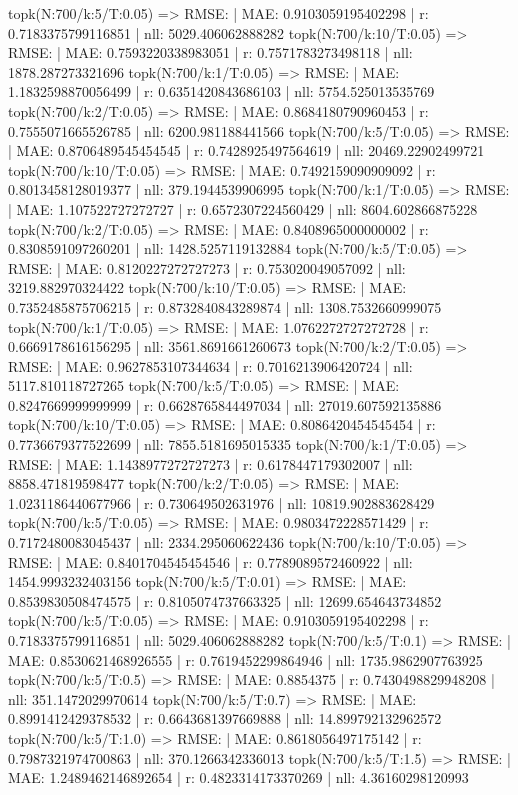 topk(N:700/k:5/T:0.05) => RMSE: | MAE: 0.9103059195402298 | r: 0.7183375799116851 | nll: 5029.406062888282
topk(N:700/k:10/T:0.05) => RMSE: | MAE: 0.7593220338983051 | r: 0.7571783273498118 | nll: 1878.287273321696
topk(N:700/k:1/T:0.05) => RMSE: | MAE: 1.1832598870056499 | r: 0.6351420843686103 | nll: 5754.525013535769
topk(N:700/k:2/T:0.05) => RMSE: | MAE: 0.8684180790960453 | r: 0.7555071665526785 | nll: 6200.981188441566
topk(N:700/k:5/T:0.05) => RMSE: | MAE: 0.8706489545454545 | r: 0.7428925497564619 | nll: 20469.22902499721
topk(N:700/k:10/T:0.05) => RMSE: | MAE: 0.7492159090909092 | r: 0.8013458128019377 | nll: 379.1944539906995
topk(N:700/k:1/T:0.05) => RMSE: | MAE: 1.107522727272727 | r: 0.6572307224560429 | nll: 8604.602866875228
topk(N:700/k:2/T:0.05) => RMSE: | MAE: 0.8408965000000002 | r: 0.8308591097260201 | nll: 1428.5257119132884
topk(N:700/k:5/T:0.05) => RMSE: | MAE: 0.8120227272727273 | r: 0.753020049057092 | nll: 3219.882970324422
topk(N:700/k:10/T:0.05) => RMSE: | MAE: 0.7352485875706215 | r: 0.8732840843289874 | nll: 1308.7532660999075
topk(N:700/k:1/T:0.05) => RMSE: | MAE: 1.0762272727272728 | r: 0.6669178616156295 | nll: 3561.8691661260673
topk(N:700/k:2/T:0.05) => RMSE: | MAE: 0.9627853107344634 | r: 0.7016213906420724 | nll: 5117.810118727265
topk(N:700/k:5/T:0.05) => RMSE: | MAE: 0.8247669999999999 | r: 0.6628765844497034 | nll: 27019.607592135886
topk(N:700/k:10/T:0.05) => RMSE: | MAE: 0.8086420454545454 | r: 0.7736679377522699 | nll: 7855.5181695015335
topk(N:700/k:1/T:0.05) => RMSE: | MAE: 1.1438977272727273 | r: 0.6178447179302007 | nll: 8858.471819598477
topk(N:700/k:2/T:0.05) => RMSE: | MAE: 1.0231186440677966 | r: 0.730649502631976 | nll: 10819.902883628429
topk(N:700/k:5/T:0.05) => RMSE: | MAE: 0.9803472228571429 | r: 0.7172480083045437 | nll: 2334.295060622436
topk(N:700/k:10/T:0.05) => RMSE: | MAE: 0.8401704545454546 | r: 0.7789089572460922 | nll: 1454.9993232403156
topk(N:700/k:5/T:0.01) => RMSE: | MAE: 0.8539830508474575 | r: 0.8105074737663325 | nll: 12699.654643734852
topk(N:700/k:5/T:0.05) => RMSE: | MAE: 0.9103059195402298 | r: 0.7183375799116851 | nll: 5029.406062888282
topk(N:700/k:5/T:0.1) => RMSE: | MAE: 0.8530621468926555 | r: 0.7619452299864946 | nll: 1735.9862907763925
topk(N:700/k:5/T:0.5) => RMSE: | MAE: 0.8854375 | r: 0.7430498829948208 | nll: 351.1472029970614
topk(N:700/k:5/T:0.7) => RMSE: | MAE: 0.8991412429378532 | r: 0.6643681397669888 | nll: 14.899792132962572
topk(N:700/k:5/T:1.0) => RMSE: | MAE: 0.8618056497175142 | r: 0.7987321974700863 | nll: 370.1266342336013
topk(N:700/k:5/T:1.5) => RMSE: | MAE: 1.2489462146892654 | r: 0.4823314173370269 | nll: 4.36160298120993

